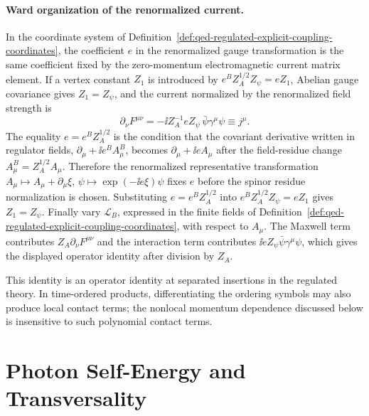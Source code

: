 \paragraph{Ward organization of the renormalized current.}
In the coordinate system of
Definition~\ref{def:qed-regulated-explicit-coupling-coordinates}, the
coefficient \(e\) in the renormalized gauge transformation is the same
coefficient fixed by the zero-momentum electromagnetic current matrix element.
If a vertex constant \(Z_1\) is introduced by
\(e^BZ_A^{1/2}Z_\psi=eZ_1\), Abelian gauge covariance gives
\(Z_1=Z_\psi\), and the current normalized by the renormalized field strength is
\[
  \partial_\nu F^{\mu\nu}
  =
  -\ii Z_A^{-1}eZ_\psi\,\bar\psi\gamma^\mu\psi
  \equiv j^\mu .
\]
The equality \(e=e^BZ_A^{1/2}\) is the condition that the covariant derivative
written in regulator fields,
\(\partial_\mu+\ii e^BA_\mu^B\), becomes
\(\partial_\mu+\ii eA_\mu\) after the field-residue change
\(A_\mu^B=Z_A^{1/2}A_\mu\).  Therefore the renormalized representative
transformation
\(A_\mu\mapsto A_\mu+\partial_\mu\xi\),
\(\psi\mapsto \exp(-\ii e\xi)\psi\) fixes \(e\) before the spinor residue
normalization is chosen.  Substituting \(e=e^BZ_A^{1/2}\) into
\(e^BZ_A^{1/2}Z_\psi=eZ_1\) gives \(Z_1=Z_\psi\).  Finally vary
\(\mathcal L_B\), expressed in the finite fields of
Definition~\ref{def:qed-regulated-explicit-coupling-coordinates}, with respect
to \(A_\mu\).  The Maxwell term contributes \(Z_A\partial_\nu F^{\mu\nu}\) and
the interaction term contributes \(\ii eZ_\psi\bar\psi\gamma^\mu\psi\), which
gives the displayed operator identity after division by \(Z_A\).

This identity is an operator identity at separated insertions in the regulated
theory.  In time-ordered products, differentiating the ordering symbols may
also produce local contact terms; the nonlocal momentum dependence discussed
below is insensitive to such polynomial contact terms.

\section{Photon Self-Energy and Transversality}

